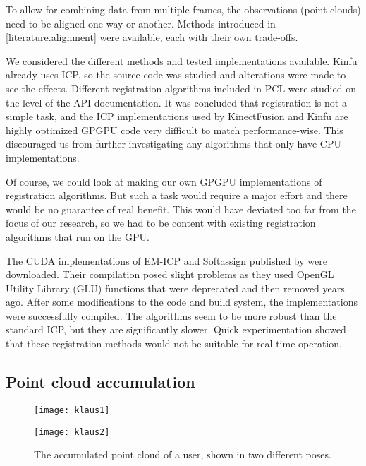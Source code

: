 To allow for combining data from multiple frames, the observations (point clouds) need to be aligned one way or another. Methods introduced in \autoref{literature.alignment} were available, each with their own trade-offs.

We considered the different methods and tested implementations available. Kinfu already uses ICP, so the source code was studied and alterations were made to see the effects. Different registration algorithms included in PCL were studied on the level of the API documentation. It was concluded that registration is not a simple task, and the ICP implementations used by KinectFusion and Kinfu are highly optimized GPGPU code very difficult to match performance-wise. This discouraged us from further investigating any algorithms that only have CPU implementations.

Of course, we could look at making our own GPGPU implementations of registration algorithms. But such a task would require a major effort and there would be no guarantee of real benefit. This would have deviated too far from the focus of our research, so we had to be content with existing registration algorithms that run on the GPU.

The CUDA implementations of EM-ICP and Softassign published by \citet{tamaki2010softassign} were downloaded. Their compilation posed slight problems as they used OpenGL Utility Library (GLU) functions that were deprecated and then removed years ago. After some modifications to the code and build system, the implementations were successfully compiled. The algorithms seem to be more robust than the standard ICP, but they are significantly slower. Quick experimentation showed that these registration methods would not be suitable for real-time operation.

\subsection{Point cloud accumulation} \label{approach.accumulation}

\begin{figure}
    \centering
    \begin{minipage}{0.49\textwidth}
        \texttt{[image: klaus1]}
    \end{minipage}
    \begin{minipage}{0.49\textwidth}
        \texttt{[image: klaus2]}
    \end{minipage}
    \caption{The accumulated point cloud of a user, shown in two different poses.}
    \label{fig:klaus}
\end{figure}

